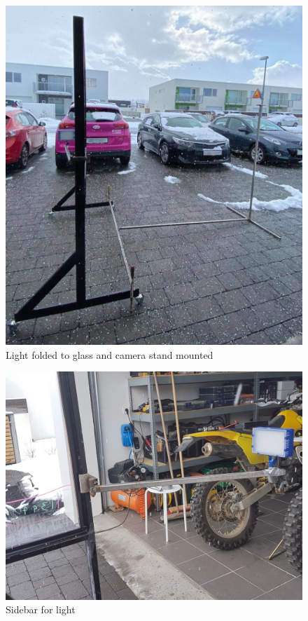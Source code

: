 \documentclass[a4paper]{jpconf}
\begin{document}
\begin{figure}[H]
	\centering
	\includegraphics[width=1\linewidth]{graphicsFromGardabae/Light.jpg}
	\caption{Light folded to glass and camera stand mounted}
	\label{fig:lightfold}
\end{figure}
\begin{figure}[H]
	\centering
	\includegraphics[width=1\linewidth]{graphicsFromGardabae/SideBar.jpg}
	\caption{Sidebar for light}
	\label{fig:sidebar1}
\end{figure}
\end{document}
